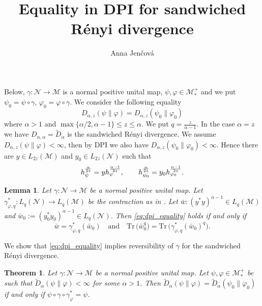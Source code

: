 \documentclass[12pt]{article}
\title{Equality in DPI for sandwiched R\'enyi divergence}
\author{Anna Jen\v cov\'a}
\newtheorem{lemma}{Lemma}
\newtheorem{theorem}{Theorem}
\theoremstyle{definition}
\theoremstyle{remark}
\def\Me{\mathcal M}
\def\Ne{\mathcal N}
\def \Tr{\mathrm{Tr}\,}
\def\ffi{\varphi}
\begin{document}
\maketitle

Below, $\gamma:\Ne\to \Me$ is a normal positive unital map, $\psi,\ffi\in \Me_*^+$ and we
put $\psi_0=\psi\circ\gamma$, $\ffi_0=\ffi\circ\gamma$. We consider the following equality
\begin{equation}\label{eq:dpi_equality}
D_{\alpha,z}(\psi\|\ffi)=D_{\alpha,z}(\psi_0\|\ffi_0)
\end{equation}
where $\alpha>1$ and $\max\{\alpha/2,\alpha-1\}\le z\le \alpha$. We put $q=\frac
z{\alpha-1}$. In the case $\alpha=z$ we have $D_{\alpha,\alpha}=\tilde D_\alpha$ is the
sandwiched R\'enyi divergence. We assume $D_{\alpha,z}(\psi\|\ffi)<\infty$, then by DPI we
also have $D_{\alpha,z}(\psi_0\|\ffi_0)<\infty$. Hence there are  $y\in L_{2z}(\Me)$ and
$y_0\in L_{2z}(\Ne)$ such that 
\[
h_\psi^{\alpha\over 2z}=yh_\ffi^{\alpha-1\over
2z},\qquad h_{\psi_0}^{\alpha\over 2z}=y_0h_{\ffi_0}^{\alpha-1\over
2z}.
\]

\begin{lemma}\cite[Lemma 3.10]{hiai2024ontheproperties}\label{lemma:le} Let $\gamma:\Ne\to\Me$ be a normal positive unital map.
Let $\gamma^*_{\ffi,q}:L_q(\Ne)\to L_q(\Me)$ be the contraction as in \cite[Lemma 3.1]{hiai2024ontheproperties}.
Let $\bar w:(y^*y)^{\alpha-1}\in L_q(\Me)$ and $\bar w_0:=(y_0^*y_0)^{\alpha-1}\in
L_q(\Ne)$. Then \eqref{eq:dpi_equality} holds if and only if
\begin{equation}\label{eq:dpiw}
\bar w=\gamma^*_{\ffi,q}(\bar w_0)\quad \text{and}\quad
\Tr \bigl(\bar w_0^q\bigr)=\Tr \bigl(\gamma^*_{\varphi,q}(\bar w_0)^q\bigr).
\end{equation}


\end{lemma}

We show that \eqref{eq:dpi_equality} implies reversibility of $\gamma$ for the sandwiched
R\'enyi divergence. 

\begin{theorem}\label{thm:sandwiched} Let $\gamma:\Ne\to \Me$ be a normal positive unital
map. Let $\psi,\ffi\in \Me_*^+$ be such that  $\tilde
D_\alpha(\psi\|\ffi)<\infty$ for some $\alpha>1$. Then $\tilde D_\alpha(\psi\|\ffi)=\tilde
D_\alpha(\psi_0\|\ffi_0)$ if and only if $\psi\circ\gamma\circ\gamma^*_\ffi=\psi$.


\end{theorem}
\end{document}
